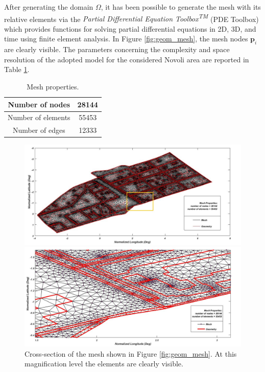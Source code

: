 \documentclass[journal]{IEEEtran}
\begin{document}
After generating the domain $\Omega$, it has been possible to generate the mesh with its relative elements via the \textit{Partial Differential Equation Toolbox\textsuperscript{TM}} (PDE Toolbox) which provides functions for solving partial differential equations in 2D, 3D, and time using finite element analysis. 
In Figure \ref{fig:geom_mesh}, the mesh nodes $\textbf{p}_{i}$ are clearly visible. The parameters concerning the complexity and space resolution of the adopted model for the considered Novoli area are reported in Table \ref{tab:Mesh_properties}.
\begin{table}[tbp]
\centering
 \begin{center}  
  \begin{tabular}{|c|c|}
\hline
Number of nodes & 28144 \\ \hline
Number of elements & 55453 \\ \hline
Number of edges & 12333 \\
\hline
  \end{tabular}
\end{center}  
\caption{Mesh properties.}
  \label{tab:Mesh_properties}
\end{table}
\begin{figure}[tbp]
	\centering
\hspace*{0cm}%
	\includegraphics[width=.5\textwidth]{figure/Mesh_3.jpg}
	\caption{Mesh extrapolated from the geometry of the area of interest. At this magnification level, the elements of the mesh are almost indistinguishable; conversely the elements are visible at a higher magnification level as shown in Figure \ref{fig:geom_mesh_2}, where the mesh cross-section within the yellow-bordered box is enlarged.}
	\label{fig:geom_mesh}
		\centering
\hspace*{0cm}%
	\includegraphics[width=.5\textwidth]{figure/cross_section_mesh.jpg}
	\caption{Cross-section of the mesh shown in Figure \ref{fig:geom_mesh}. At this magnification level the elements are clearly visible.}
	\label{fig:geom_mesh_2}
\end{figure}
\end{document}
